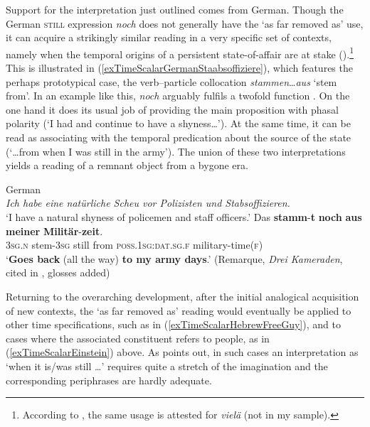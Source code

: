 Support for the interpretation just outlined comes from German. Though the German \textsc{still} expression \textit{noch} does not generally have the \lq as far removed as\rq{ }use, it can acquire a strikingly similar reading in a very specific set of contexts, namely when the temporal origins of a persistent state-of-affair are at stake ().\footnote{According to \textcite{Mustajoki1988}, the same usage is attested for  \textit{vielä} (not in my sample).} This is illustrated in (\ref{exTimeScalarGermanStaabsoffiziere}), which features the perhaps prototypical case, the verb–particle collocation \textit{stammen}…\textit{aus} \lq stem from\rq{}.  In an example like this, \textit{noch} arguably fulfils a twofold function \parencite{Shetter1966}. On the one hand it does its usual job of providing the main proposition with phasal polarity (\lq I had and continue to have a shyness…\rq{}). At the same time, it can be read as associating with the temporal predication about the source of the state (\lq …from when I was still in the army\rq{}). The union of these two interpretations yields a reading of a remnant object from a bygone era.

\begin{exe}
	\ex German\label{exTimeScalarGermanStaabsoffiziere}\\
	\textit{Ich habe eine natürliche Scheu vor Polizisten und Stabsoffizieren.}\\
	 \lq I have a natural shyness of policemen and staff officers.\rq
	 \exi{} \gll Das \textbf{stamm}-\textbf{t} \textbf{noch} \textbf{aus} \textbf{meiner} \textbf{Militär}-\textbf{zeit}.\\
	 3\textsc{sg}.\textsc{n} stem-3\textsc{sg} still from \textsc{poss}.1\textsc{sg}:\textsc{dat}.\textsc{sg}.\textsc{f} military-time(\textsc{f})\\
	\glt \lq \textbf{Goes back} (all the way) \textbf{to my army days}.' (Remarque, \textit{Drei Kameraden}, cited in \cite[466]{Shetter1966},  glosses added)	
\end{exe}

Returning to the overarching development, after the initial analogical acquisition of new contexts, the \lq as far removed as\rq{ }reading would eventually be applied to other time specifications, such as in (\ref{exTimeScalarHebrewFreeGuy}), and to cases where the associated constituent refers to people, as in (\ref{exTimeScalarEinstein}) above. As \textcite{Mustajoki1988} points out, in such cases an interpretation as \lq when it is/was still …\rq{ }requires quite a stretch of the imagination and the corresponding periphrases are hardly adequate.

